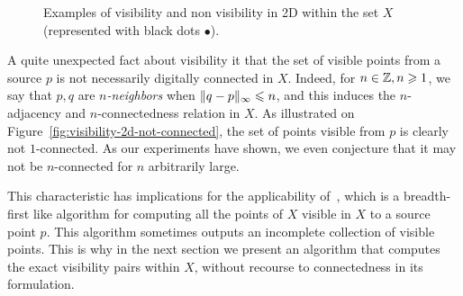     \begin{figure}[t]
      \centering
      
      \caption{Examples of visibility and non visibility in 2D within
        the set $X$ (represented with black dots $\bullet$).}
      \label{fig:visibility-2d}
    \end{figure}


    A quite unexpected fact about visibility it that the set of
    visible points from a source $p$ is not necessarily digitally
    connected in $X$. Indeed, for $n \in \mathbb{Z}, n \geqslant 1$, we say that
    $p,q$ are \emph{$n$-neighbors} when $\|q-p\|_\infty \leqslant n$, and
    this induces the $n$-adjacency and $n$-connectedness relation in
    $X$. As illustrated on
    Figure~\ref{fig:visibility-2d-not-connected}, the set of points
    visible from $p$ is clearly not $1$-connected. As our experiments
    have shown, we even conjecture that it may not be $n$-connected
    for $n$ arbitrarily large.

    This characteristic has implications for the applicability of~\cite[Algorithm 3]{lachaud:2022-jmiv}, which is a breadth-first
    like algorithm for computing all the points of $X$ visible in $X$
    to a source point $p$. This algorithm sometimes outputs an
    incomplete collection of visible points. This is why in the next
    section we present an algorithm that computes the exact visibility
    pairs within $X$, without recourse to connectedness in its formulation.


